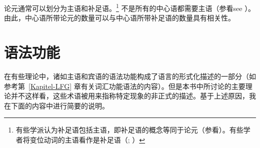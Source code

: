 论元通常可以划分为主语和补足语。\footnote{有些学派认为补足语包括主语，即补足语的概念等同于论元（参看\citealp[]{Gross2003a}）。有些学者将变位动词的主语看作是补足语（\citealp{Pollard90a-Eng}; \citealp[]{Eisenberg94b}）} 不是所有的中心语都需要主语（参看see \citealp[Section~3.2]{MuellerLehrbuch1}）。由此，中心语所带论元的数量可以与中心语所带补足语的数量具有相关性。

\largerpage
\section{语法功能}
\label{Abschnitt-GF}
在有些理论中，诸如主语和宾语的语法功能构成了语言的形式化描述的一部分（如参考第~\ref{Kapitel-LFG} 章有关词汇功能语法的内容）。但是本书中所讨论的主要理论并不这样看，这些术语被用来指称特定现象的非正式的描述。基于上述原因，我在下面的内容中进行简要的说明。

